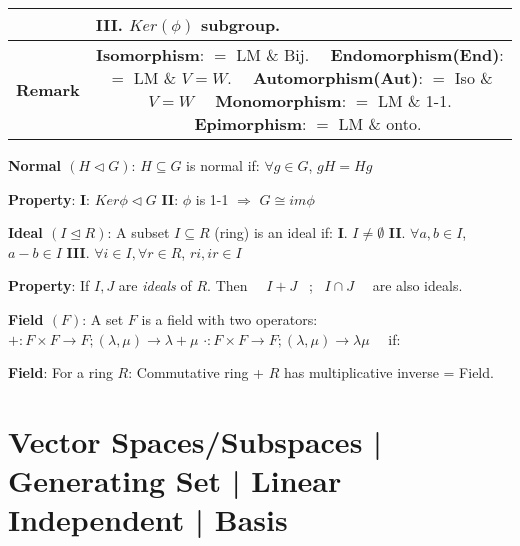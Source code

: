 \documentclass[9pt]{article}
\begin{document}
{\begin{longtable}{l@{\hskip 2pt}||l|l|l|l}
                           & \textbf{III}. $Ker(\phi)$ subgroup.                                          &                                                                                   &                                                                                                                                    &                                                                                   \\
    \hline
    \textbf{\tiny Remark}  & \multicolumn{4}{c}{\textbf{Isomorphism}: $=$ LM \& Bij. \ \ \textbf{Endomorphism(End)}: $=$ LM \& $V=W$. \ \ \textbf{Automorphism(Aut)}: $=$ Iso \& $V=W$ \ \ \textbf{Monomorphism}: $=$ LM \& 1-1. \ \ \textbf{Epimorphism}: $=$ LM \& onto.}

\end{longtable}
}
\vspace{-8pt}

\textbf{Normal $(H\lhd G)$}: {\small $H\subseteq G$ is normal if: $\forall g\in G$, $gH=Hg$} 

\qquad \textbf{Property}: \textbf{I}: $Ker\phi\lhd G$ \quad \textbf{II}: $\phi$ is 1-1 $\Rightarrow$ $G\cong im\phi$

\textbf{Ideal $(I\trianglelefteq R)$}: A subset $I\subseteq R$ (ring) is an ideal if: \quad \textbf{I}. $I\ne\emptyset$ \quad \textbf{II}. $\forall a,b\in I$, $a-b\in I$ \quad \textbf{III}. $\forall i\in I,\forall r\in R$, $ri,ir\in I$ 

\qquad \textbf{Property}: If $I,J$ are \textit{ideals} of $R$. Then \ \ $I+J$ \ ; \ $I\cap J$ \ \ are also ideals.

\textbf{Field $(F)$}: {\small A set $F$ is a field with two operators: $+:F\times F\to F;(\lambda,\mu)\to\lambda+\mu$ $\cdot:F\times F\to F;(\lambda,\mu)\to\lambda\mu$ \ \ if:}

\quad \quad \quad {}

\qquad \qquad  \textbf{Field}: For a ring $R$: Commutative ring + $R$ has multiplicative inverse = Field.


\section{Vector Spaces/Subspaces | Generating Set | Linear Independent | Basis} %
\end{document}
